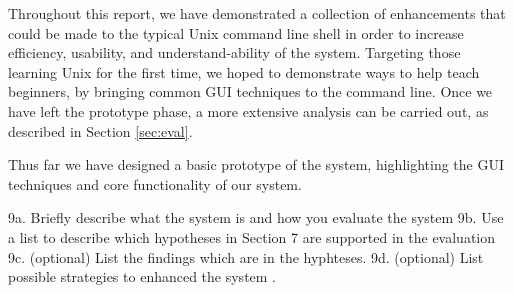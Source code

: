 Throughout this report, we have demonstrated a collection of enhancements that
could be made to the typical Unix command line shell in order to increase
efficiency, usability, and understand-ability of the system. Targeting those
learning Unix for the first time, we hoped to demonstrate ways to help teach
beginners, by bringing common GUI techniques to the command line. Once we have
left the prototype phase, a more extensive analysis can be carried out, as
described in Section \ref{sec:eval}.

Thus far we have designed a basic prototype of the system, highlighting the
GUI techniques and core functionality of our system. 

9a. Briefly describe what the system is and how you evaluate the system
9b. Use a list to describe which hypotheses in Section 7 are supported in the evaluation
9c. (optional) List the findings which are in the hyphteses.
9d. (optional) List possible strategies to enhanced the system
.

